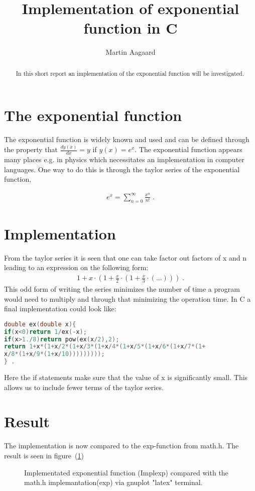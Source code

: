\documentclass{article}
\title{Implementation of exponential function in C}
\author{Martin Aagaard}
\date{}
\begin{document}
\maketitle 
\begin{abstract}
In this short report an implementation of the exponential function
will be investigated.  
\end{abstract}

\section{The exponential function}
The exponential function is widely known and used and can be defined through the
property that $\frac{d y(x)}{dx} = y$ if $y(x)=e^x$. The exponential function
appears many places e.g. in physics which necessitates an implementation in
computer languages. One way to do this is through the taylor series of the
exponential function, 

\begin{align}
e^x=\sum^{\infty}_{n=0} \frac{x^n}{n!} \label{Taylor_exp} \; . 
\end{align}

\section{Implementation}
From the taylor series it is seen that one can take factor out factors of x and 
n leading to an expression on the following form:
\begin{align}
1+x\cdot(1+\frac{x}{2}\cdot(1+\frac{x}{3}\cdot(...))) \; .
\end{align}
This odd form of writing the series minimizes the number of time a program would
need to multiply and through that minimizing the operation time. 
In C a final implementation could look like:
\begin{lstlisting}[language=C]
double ex(double x){
if(x<0)return 1/ex(-x);
if(x>1./8)return pow(ex(x/2),2);
return 1+x*(1+x/2*(1+x/3*(1+x/4*(1+x/5*(1+x/6*(1+x/7*(1+
x/8*(1+x/9*(1+x/10)))))))));
} . 
\end{lstlisting}
Here the if statements make sure that the value of x is significantly small. 
This allows us to include fewer terms of the taylor series.

\section{Result}
The implementation is now compared to the exp-function from math.h. The result
is seen in figure~(\ref{fig:exp})
	\begin{figure}

\caption{Implementated exponential function (Implexp) compared with the math.h 
implemantation(exp) via gnuplot "latex" terminal.}
\label{fig:exp}
	\end{figure} 
\end{document}
